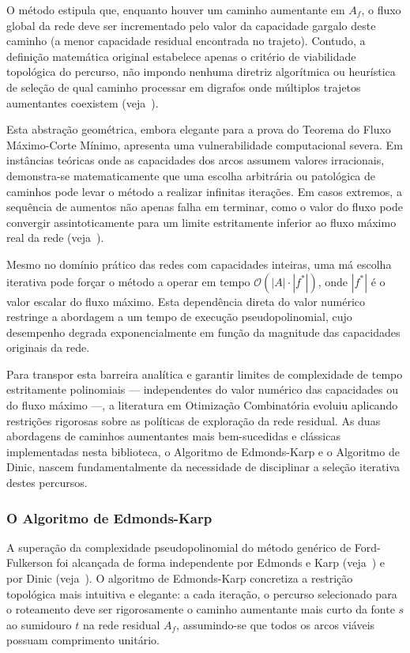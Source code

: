 \documentclass[12pt,a4paper]{article}
\begin{document}
O método estipula que, enquanto houver um caminho aumentante em $A_f$, o fluxo global da rede deve ser incrementado pelo valor da capacidade gargalo deste caminho (a menor capacidade residual encontrada no trajeto). Contudo, a definição matemática original estabelece apenas o critério de viabilidade topológica do percurso, não impondo nenhuma diretriz algorítmica ou heurística de seleção de qual caminho processar em digrafos onde múltiplos trajetos aumentantes coexistem (veja~\cite{ahuja1993network}).

Esta abstração geométrica, embora elegante para a prova do Teorema do Fluxo Máximo-Corte Mínimo, apresenta uma vulnerabilidade computacional severa. Em instâncias teóricas onde as capacidades dos arcos assumem valores irracionais, demonstra-se matematicamente que uma escolha arbitrária ou patológica de caminhos pode levar o método a realizar infinitas iterações. Em casos extremos, a sequência de aumentos não apenas falha em terminar, como o valor do fluxo pode convergir assintoticamente para um limite estritamente inferior ao fluxo máximo real da rede (veja~\cite{cook1998combinatorial}).

Mesmo no domínio prático das redes com capacidades inteiras, uma má escolha iterativa pode forçar o método a operar em tempo $\mathcal{O}(|A| \cdot |f^*|)$, onde $|f^*|$ é o valor escalar do fluxo máximo. Esta dependência direta do valor numérico restringe a abordagem a um tempo de execução pseudopolinomial, cujo desempenho degrada exponencialmente em função da magnitude das capacidades originais da rede.

Para transpor esta barreira analítica e garantir limites de complexidade de tempo estritamente polinomiais — independentes do valor numérico das capacidades ou do fluxo máximo —, a literatura em Otimização Combinatória evoluiu aplicando restrições rigorosas sobre as políticas de exploração da rede residual. As duas abordagens de caminhos aumentantes mais bem-sucedidas e clássicas implementadas nesta biblioteca, o Algoritmo de Edmonds-Karp e o Algoritmo de Dinic, nascem fundamentalmente da necessidade de disciplinar a seleção iterativa destes percursos.

\subsubsection{O Algoritmo de Edmonds-Karp}

A superação da complexidade pseudopolinomial do método genérico de Ford-Fulkerson foi alcançada de forma independente por Edmonds e Karp (veja~\cite{edmonds1972theoretical}) e por Dinic (veja~\cite{dinic1970algorithm}). O algoritmo de Edmonds-Karp concretiza a restrição topológica mais intuitiva e elegante: a cada iteração, o percurso selecionado para o roteamento deve ser rigorosamente o caminho aumentante mais curto da fonte $s$ ao sumidouro $t$ na rede residual $A_f$, assumindo-se que todos os arcos viáveis possuam comprimento unitário.
\end{document}

